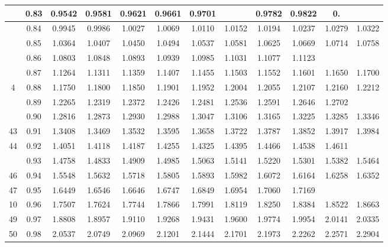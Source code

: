 \documentclass[10pt]{article}
\begin{document}
\begin{CJK*}{UTF8}{bsmi}
\begin{center}
\begin{tabular}{|c|c|c|c|c|c|c|c|c|c|c|c|}
\hline
 & 0.83 & 0.9542 & 0.9581 & 0.9621 & 0.9661 & 0.9701 &  & 0.9782 & 0.9822 & 0. &  \\
\hline
 & 0.84 & 0.9945 & 0.9986 & 1.0027 & 1.0069 & 1.0110 & 1.0152 & 1.0194 & 1.0237 & 1.0279 & 1.0322 \\
\hline
 & 0.85 & 1.0364 & 1.0407 & 1.0450 & 1.0494 & 1.0537 & 1.0581 & 1.0625 & 1.0669 & 1.0714 & 1.0758 \\
\hline
 & 0.86 & 1.0803 & 1.0848 & 1.0893 & 1.0939 & 1.0985 & 1.1031 & 1.1077 & 1.1123 &  &  \\
\hline
 & 0.87 & 1.1264 & 1.1311 & 1.1359 & 1.1407 & 1.1455 & 1.1503 & 1.1552 & 1.1601 & 1.1650 & 1.1700 \\
\hline
4 & 0.88 & 1.1750 & 1.1800 & 1.1850 & 1.1901 & 1.1952 & 1.2004 & 1.2055 & 1.2107 & 1.2160 & 1.2212 \\
\hline
 & 0.89 & 1.2265 & 1.2319 & 1.2372 & 1.2426 & 1.2481 & 1.2536 & 1.2591 & 1.2646 & 1.2702 &  \\
\hline
 & 0.90 & 1.2816 & 1.2873 & 1.2930 & 1.2988 & 1.3047 & 1.3106 & 1.3165 & 1.3225 & 1.3285 & 1.3346 \\
\hline
43 & 0.91 & 1.3408 & 1.3469 & 1.3532 & 1.3595 & 1.3658 & 1.3722 & 1.3787 & 1.3852 & 1.3917 & 1.3984 \\
\hline
44 & 0.92 & 1.4051 & 1.4118 & 1.4187 & 1.4255 & 1.4325 & 1.4395 & 1.4466 & 1.4538 & 1.4611 &  \\
\hline
 & 0.93 & 1.4758 & 1.4833 & 1.4909 & 1.4985 & 1.5063 & 1.5141 & 1.5220 & 1.5301 & 1.5382 & 1.5464 \\
\hline
46 & 0.94 & 1.5548 & 1.5632 & 1.5718 & 1.5805 & 1.5893 & 1.5982 & 1.6072 & 1.6164 & 1.6258 & 1.6352 \\
\hline
47 & 0.95 & 1.6449 & 1.6546 & 1.6646 & 1.6747 & 1.6849 & 1.6954 & 1.7060 & 1.7169 &  &  \\
\hline
10 & 0.96 & 1.7507 & 1.7624 & 1.7744 & 1.7866 & 1.7991 & 1.8119 & 1.8250 & 1.8384 & 1.8522 & 1.8663 \\
\hline
49 & 0.97 & 1.8808 & 1.8957 & 1.9110 & 1.9268 & 1.9431 & 1.9600 & 1.9774 & 1.9954 & 2.0141 & 2.0335 \\
\hline
50 & 0.98 & 2.0537 & 2.0749 & 2.0969 & 2.1201 & 2.1444 & 2.1701 & 2.1973 & 2.2262 & 2.2571 & 2.2904 \\
\hline
\end{tabular}
\end{center}

\begin{center}
\end{center}


\end{CJK*}
\end{document}
